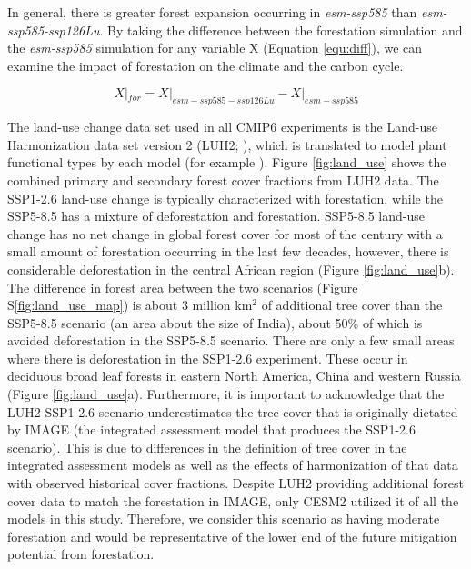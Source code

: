 \documentclass[]{article}
\begin{document}
In general, there is greater forest expansion occurring in \textit{esm-ssp585} than \textit{esm-ssp585-ssp126Lu}.
By taking the difference between the forestation simulation and the \textit{esm-ssp585} simulation for any variable X (Equation \ref{equ:diff}), we can examine the impact of forestation on the climate and the carbon cycle.

\begin{equation}
    X|_{for} = X|_{esm-ssp585-ssp126Lu} - X|_{esm-ssp585}
    \label{equ:diff}
\end{equation}

The land-use change data set used in all CMIP6 experiments is the Land-use Harmonization data set version 2 (LUH2; \cite{hurtt_harmonization_2020}), which is translated to model plant functional types by each model (for example \cite{di_vittorio_land_2014}).
Figure \ref{fig:land_use} shows the combined primary and secondary forest cover fractions from LUH2 data.
The SSP1-2.6 land-use change is typically characterized with forestation, while the SSP5-8.5 has a mixture of deforestation and forestation.
SSP5-8.5 land-use change has no net change in global forest cover for most of the century with a small amount of forestation occurring in the last few decades, however, there is considerable deforestation in the central African region (Figure \ref{fig:land_use}b).
The difference in forest area between the two scenarios (Figure S\ref{fig:land_use_map}) is about 3 million km$^2$ of additional tree cover than the SSP5-8.5 scenario (an area about the size of India), about 50\% of which is avoided deforestation in the SSP5-8.5 scenario.
There are only a few small areas where there is deforestation in the SSP1-2.6 experiment.
These occur in deciduous broad leaf forests in eastern North America, China and western Russia (Figure \ref{fig:land_use}a).
Furthermore, it is important to acknowledge that the LUH2 SSP1-2.6 scenario underestimates the tree cover that is originally dictated by IMAGE (the integrated assessment model that produces the SSP1-2.6 scenario).
This is due to differences in the definition of tree cover in the integrated assessment models as well as the effects of harmonization of that data with observed historical cover fractions.
Despite LUH2 providing additional forest cover data to match the forestation in IMAGE, only CESM2 utilized it of all the models in this study.
Therefore, we consider this scenario as having moderate forestation and would be representative of the lower end of the future mitigation potential from forestation.
\end{document}
